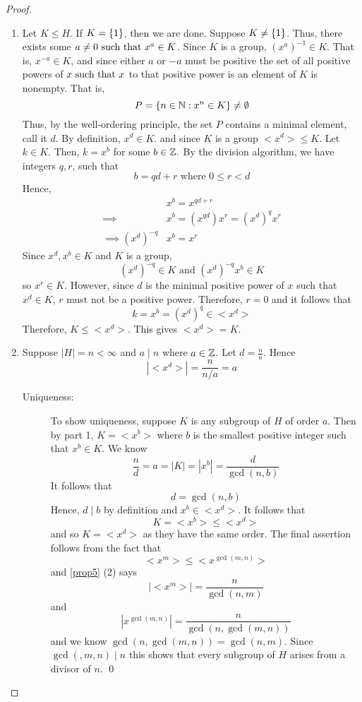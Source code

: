 \begin{proof}
    \begin{enumerate}
        \item Let $K \leq H$. If $K = \left\{1\right\}$, then we are done. Suppose $K \not = \left\{1\right\}$. Thus, there exists some $a \not = 0 \text{ such that } x^a \in K$. Since $K$ is a group, $(x^a)^{-1} \in K.$ That is, $x^{-a} \in K$, and since either $a$ or $-a$ must be positive the set of all positive powers of $x \text{ such that } x$ to that positive power is an element of $K$ is nonempty. That is,
        $$P = \left\{n \in \mathbb{N} : x^n \in K\right\} \not = \emptyset$$
        Thus, by the well-ordering principle, the set $P$ contains a minimal element, call it $d$. By definition, $x^d \in K.$ and since $K$ is a group $<x^d> \leq K.$ Let $k \in K.$ Then, $k = x^b$ for some $b \in \mathbb{Z}.$ By the division algorithm, we have integers $q,r$, such that
        $$b = qd +r \text{ where }0 \leq r < d$$
        Hence,
        \begin{align*}
            &x^b = x^{qd+r} \\
            \implies &x^b = (x^{qd})x^r = (x^d)^qx^r \\
            \implies (x^d)^{-q}&x^b = x^r
        \end{align*}
        Since $x^d, x^b \in K$ and $K$ is a group,
        $$(x^d)^{-q} \in K \text{ and } (x^d)^{-q}x^b \in K$$
        so $x^r \in K$. However, since $d$ is the minimal positive power of $x$ such that $x^d \in K$, $r$ must not be a positive power. Therefore, $r = 0$ and it follows that
        $$k = x^b = (x^d)^q \in <x^d>$$
        Therefore, $K \leq <x^d>.$ This gives $<x^d> = K$.

        \item Suppose $|H| = n < \infty$ and $a \mid n$ where $a \in \mathbb{Z}$. Let $d = \frac{n}{a}$. Hence
        $$|<x^d>| = \frac{n}{n/a} = a$$

        \begin{description}
            \item[Uniqueness: ] To show uniqueness, suppose $K$ is any subgroup of $H$ of order $a$. Then by part 1, $K = <x^b>$ where $b$ is the smallest positive integer such that $x^b \in K$. We know
            $$\frac{n}{d} = a = |K| = |x^b| = \frac{d}{\gcd(n,b)}$$
            It follows that 
            $$d = \gcd(n,b)$$
            Hence, $d \mid b$ by definition and $x^b \in <x^d>$. It follows that 
            $$K = <x^b> \leq <x^d>$$
            and so $K = <x^d>$ as they have the same order. The final assertion follows from the fact that 
            $$<x^m> \leq <x^{\gcd(m,n)}>$$
            and \ref{prop5} (2) says
            $$\left|<x^m>\right| = \frac{n}{\gcd(n,m)}$$
            and
            $$\left|x^{\gcd(m,n)}\right|=\frac{n}{\gcd(n, \gcd(m,n))}$$
            and we know $\gcd(n, \gcd(m,n)) = \gcd(n,m)$. Since $\gcd(,m,n) \mid n$ this shows that every subgroup of $H$ arises from a divisor of $n$.
            \qed
        \end{description}
    \end{enumerate}
\end{proof}